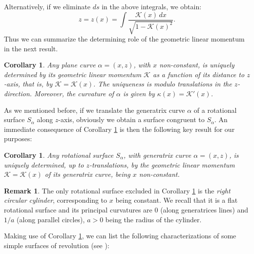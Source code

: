\documentclass[leqno,11pt]{amsart}
\newtheorem{corollary}[theorem]{Corollary}
\theoremstyle{definition}
\newtheorem{remark}[theorem]{Remark}
\numberwithin{equation}{section}
\begin{document}
Alternatively, if we eliminate $ds$ in the above integrals, we obtain:	 
\begin{equation}\label{eq:truco}
	z=z(x)= \int \frac{\mathcal K(x)\,dx}{\sqrt{1-\mathcal K(x)^2}}.
\end{equation}	 
Thus we can summarize the determining role of the geometric linear momentum in the next result.
\begin{corollary}\cite[Corollary 1]{CC22}
	\label{cor:key}
	Any plane curve $\alpha =(x,z)$, with $x$ non-constant, is uniquely determined by its geometric linear momentum $\mathcal K$ as a function of its distance to $z$-axis, that is, by $\mathcal K= \mathcal K(x)$. 
	The uniqueness is modulo translations in the $z$-direction.
	Moreover, the curvature of $\alpha $ is given by $\kappa (x)=\mathcal K' (x)$.
\end{corollary}
As we mentioned before, if we translate the generatrix curve $\alpha$ of a rotational surface $S_\alpha$  along $z$-axis, obviously we obtain a surface congruent to $S_\alpha$. An immediate consequence of Corollary \ref{cor:key} is then the following key result for our purposes: 
\begin{corollary}\cite[Corollary 2]{CC22}
	\label{cor:keysurfaces}
	Any rotational surface $S_\alpha$, with generatrix curve $\alpha = (x,z)$, is uniquely determined, up to $z$-translations, by the geometric linear momentum $\mathcal K=\mathcal K (x)$ of its generatrix curve, being $x$ non-constant. 
\end{corollary}
\begin{remark}\label{re:cylinder}
	The only rotational surface excluded in Corollary \ref{cor:keysurfaces} is the {\em right circular cylinder}, corresponding to $x$ being constant. We recall that it is a flat rotational surface and its principal curvatures are $0$ (along generatrices lines) and $1/a$ (along parallel circles), $a>0$ being the radius of the cylinder.
\end{remark}

Making use of Corollary \ref{cor:keysurfaces}, we can list the following characterizations of some simple surfaces of revolution (see \cite[Proposition 1]{CC22}):
\end{document}
